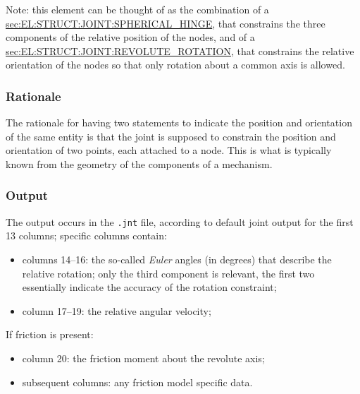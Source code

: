 Note: this element can be thought of as the combination of a 
\hyperref{\kw{spherical hinge}}{\kw{spherical hinge} (see Section~}{)}{sec:EL:STRUCT:JOINT:SPHERICAL_HINGE},
that constrains the three components of the relative position
of the nodes, and of a
\hyperref{\kw{revolute rotation}}{\kw{revolute rotation} (see Section~}{)}{sec:EL:STRUCT:JOINT:REVOLUTE_ROTATION},
that constrains the relative orientation of the nodes so that only rotation
about a common axis is allowed.

\subsubsection{Rationale}
The rationale for having two statements to indicate the position
and orientation of the same entity is that the joint is supposed
to constrain the position and orientation of two points,
each attached to a node.
This is what is typically known from the geometry of the components
of a mechanism.

\subsubsection{Output}
The output occurs in the \texttt{.jnt} file, according to default joint output
for the first 13 columns; specific columns contain:
\begin{itemize}
\item columns 14--16: the so-called \emph{Euler} angles (in degrees)
	that describe the relative rotation; only the third component
	is relevant, the first two essentially indicate the accuracy
	of the rotation constraint;
\item column 17--19: the relative angular velocity;
\end{itemize}
If friction is present:
\begin{itemize}
\item column 20: the friction moment about the revolute axis;
\item subsequent columns: any friction model specific data.
\end{itemize}

